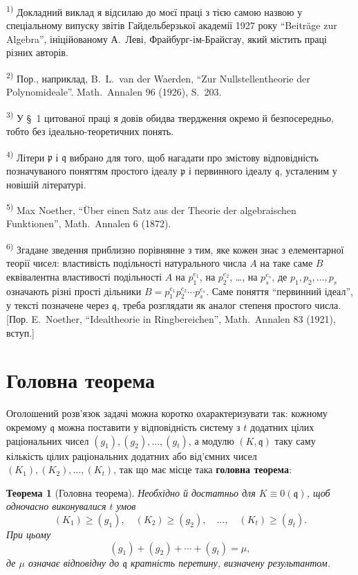 \documentclass[11pt]{article}
\newcommand{\foreign}[1]{#1}
\theoremstyle{plain}
\newtheorem{satz}{Теорема}
\begin{document}
{\footnotesize
\textsuperscript{1)} Докладний виклад я відсилаю до моєї праці з тією самою
назвою у спеціальному випуску звітів Гайдельберзької академії 1927 року
``Beiträge zur Algebra'', ініційованому А.\ Леві, Фрайбург-ім-Брайсгау, який
містить праці різних авторів.

\textsuperscript{2)} Пор., наприклад, B.\ L.\ van der Waerden, ``Zur Nullstellentheorie der Polynomideale''.
\foreign{Math.\ Annalen} 96 (1926), S.~203.

\textsuperscript{3)} У \S~1 цитованої праці я довів обидва твердження окремо й
безпосередньо, тобто без ідеально-теоретичних понять.

\textsuperscript{4)} Літери $\mathfrak{p}$ і $\mathfrak{q}$ вибрано для того, щоб нагадати про
змістову відповідність позначуваного поняттям простого ідеалу
$\mathfrak{p}$ і первинного ідеалу $\mathfrak{q}$, усталеним у новішій літературі.

\textsuperscript{5)} Max Noether, ``Über einen Satz aus der Theorie der algebraischen Funktionen'',
\foreign{Math.\ Annalen} 6 (1872).

\textsuperscript{6)} Згадане зведення приблизно порівнянне з тим, яке кожен знає з
елементарної теорії чисел: властивість подільності натурального числа
$A$ на таке саме $B$ еквівалентна властивості подільності $A$ на
$p_{1}^{e_{1}}$, на $p_{2}^{e_{2}}$, \ldots, на $p_{s}^{e_{s}}$, де
$p_{1}, p_{2}, \ldots, p_{s}$ означають різні прості дільники
$B = p_{1}^{e_{1}}p_{2}^{e_{2}} \cdots p_{s}^{e_{s}}$. Саме поняття
``первинний ідеал'', у тексті позначене через $\mathfrak{q}$, треба
розглядати як аналог степеня простого числа. [Пор. E.\ Noether,
``Idealtheorie in Ringbereichen'', \foreign{Math.\ Annalen} 83 (1921), вступ.]
}

\newpage
\section*{Головна теорема}

Оголошений розв'язок задачі можна коротко охарактеризувати так:
кожному окремому $\mathfrak{q}$ можна поставити у відповідність
систему з $t$ додатних цілих раціональних чисел
$(g_{1}), (g_{2}), \ldots, (g_{t})$, а модулю $(K, \mathfrak{q})$ таку
саму кількість цілих раціональних додатних або від'ємних чисел
$(K_{1}), (K_{2}), \ldots, (K_{t})$, так що має місце така
\textbf{головна теорема}:

\begin{satz}[Головна теорема]\label{satz:kap-II}
Необхідно й достатньо для $K \equiv 0(\mathfrak{q})$, щоб одночасно
виконувалися $t$ умов
\[
(K_{1}) \geq (g_{1}), \quad (K_{2}) \geq (g_{2}), \quad\ldots,\quad (K_{t}) \geq (g_{t}).
\]
При цьому
\[
(g_{1}) + (g_{2}) + \cdots + (g_{t}) = \mu,
\]
де $\mu$ означає відповідну до $\mathfrak{q}$ кратність перетину,
визначену результантом.
\end{satz}
\end{document}
